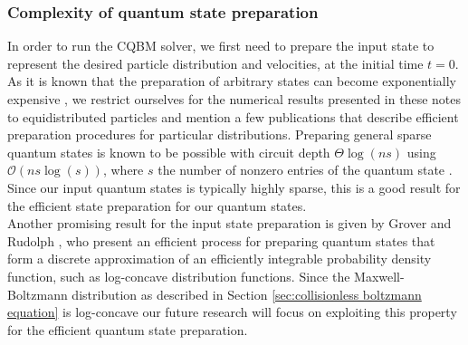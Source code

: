 \subsubsection{Complexity of quantum state preparation}\label{sssec:stateprep}
In order to run the CQBM solver, we first need to prepare the input state to represent the desired particle distribution and velocities, at the initial time $t=0$.
As it is known that the preparation of arbitrary states can become exponentially expensive \cite{Plesch2011, mikeandike}, we restrict ourselves for the numerical results presented in these notes to equidistributed particles and mention a few publications that describe efficient preparation procedures for particular distributions.
Preparing general sparse quantum states is known to be possible with circuit depth $\Theta \log \left (ns\right )$ using $\mathcal{O}\left ( ns \log(s) \right)$, where $s $ the number of nonzero entries of the quantum state \cite{Zhang2022}. Since our input quantum states is typically highly sparse, this is a good result for the efficient state preparation for our quantum states.\\
Another promising result for the input state preparation is given by Grover and Rudolph \cite{Grover2002}, who present an efficient process for preparing quantum states that form a discrete approximation of an efficiently integrable probability density function, such as log-concave distribution functions. Since the Maxwell-Boltzmann distribution as described in Section \ref{sec:collisionless boltzmann equation} is log-concave our future research will focus on exploiting this property for the efficient quantum state preparation.

